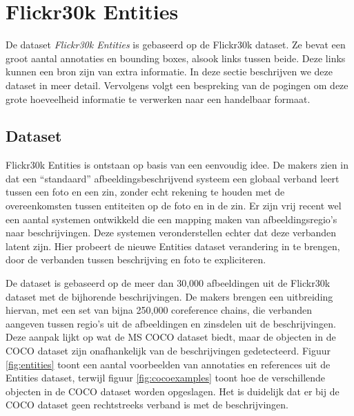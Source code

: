 \section{Flickr30k Entities}
De dataset \emph{Flickr30k Entities}\cite{Plummer2015} is gebaseerd op de Flickr30k dataset. Ze bevat een groot aantal annotaties en bounding boxes, alsook links tussen beide. Deze links kunnen een bron zijn van extra informatie. In deze sectie beschrijven we deze dataset in meer detail. Vervolgens volgt een bespreking van de pogingen om deze grote hoeveelheid informatie te verwerken naar een handelbaar formaat. 

\subsection{Dataset}
\label{sub:Dataset}
Flickr30k Entities is ontstaan op basis van een eenvoudig idee. De makers zien in dat een ``standaard'' afbeeldingsbeschrijvend systeem een globaal verband leert tussen een foto en een zin, zonder echt rekening te houden met de overeenkomsten tussen entiteiten op de foto en in de zin. Er zijn vrij recent wel een aantal systemen ontwikkeld die een mapping maken van afbeeldingsregio's naar beschrijvingen. Deze systemen veronderstellen echter dat deze verbanden latent zijn. Hier probeert de nieuwe Entities dataset verandering in te brengen, door de verbanden tussen beschrijving en foto te expliciteren.

De dataset is gebaseerd op de meer dan 30,000 afbeeldingen uit de Flickr30k\cite{Young2014} dataset met de bijhorende beschrijvingen. De makers brengen een uitbreiding hiervan, met een set van bijna 250,000 coreference chains, die verbanden aangeven tussen regio's uit de afbeeldingen en zinsdelen uit de beschrijvingen. Deze aanpak lijkt op wat de MS COCO\cite{Lin2014} dataset biedt, maar de objecten in de COCO dataset zijn onafhankelijk van de beschrijvingen gedetecteerd. Figuur \ref{fig:entities} toont een aantal voorbeelden van annotaties en references uit de Entities dataset, terwijl figuur \ref{fig:cocoexamples} toont hoe de verschillende objecten in de COCO dataset worden opgeslagen. Het is duidelijk dat er bij de COCO dataset geen rechtstreeks verband is met de beschrijvingen. 

